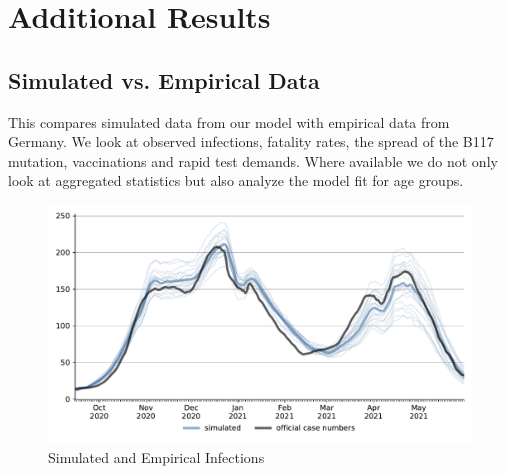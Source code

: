 \section{Additional Results}
\label{sec:additional_results}

\subsection{Simulated vs. Empirical Data}
\label{subsec:new_cases_fit}

This compares simulated data from our model with empirical data from Germany. We look at
observed infections, fatality rates, the spread of the B117 mutation, vaccinations and
rapid test demands. Where available we do not only look at aggregated statistics but also
analyze the model fit for age groups.


\begin{figure}[ht]
  \centering
  \includegraphics[width=\textwidth]{../figures/results/figures/scenario_comparisons/combined_fit/full_new_known_case_with_single_runs}
  \caption{Simulated and Empirical Infections}
  \label{fig:aggregated_fit2}
\end{figure}




